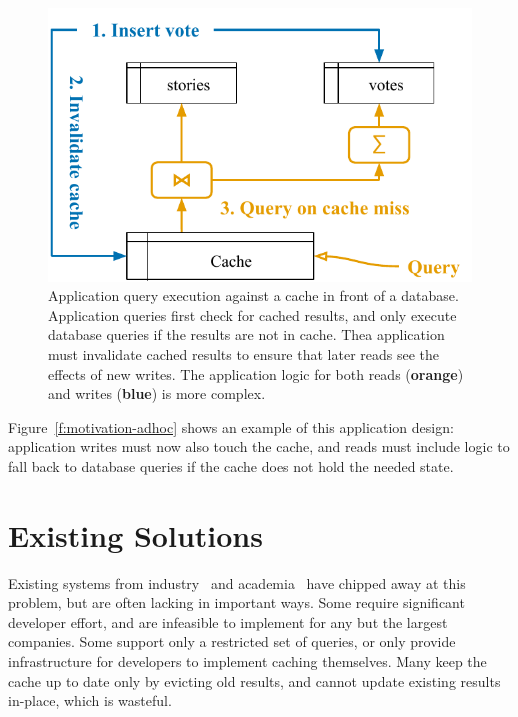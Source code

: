 \begin{figure}
  \centering
  \includegraphics{diagrams/Motivation Ad Hoc Cache.pdf}
  \caption{Application query execution against a cache in front of a database.
  Application queries first check for cached results, and only execute database
  queries if the results are not in cache. Thea application must invalidate
  cached results to ensure that later reads see the effects of new writes. The
  application logic for both reads (\textbf{\color{set2}orange}) and writes
  (\textbf{\color{set1}blue}) is more complex.}
  \label{f:motivation-adhoc}
\end{figure}

Figure~\vref{f:motivation-adhoc} shows an example of this application design:
application writes must now also touch the cache, and reads must include logic
to fall back to database queries if the cache does not hold the needed state.

\section{Existing Solutions}

Existing systems from industry~\cite{facebook-memcache, tao, flannel} and
academia~\cite{txcache, cachegenie, casql-consistency-thesis, pequod} have
chipped away at this problem, but are often lacking in important ways. Some
require significant developer effort, and are infeasible to implement for any
but the largest companies. Some support only a restricted set of queries, or
only provide infrastructure for developers to implement caching themselves. Many
keep the cache up to date only by evicting old results, and cannot update
existing results in-place, which is wasteful.

